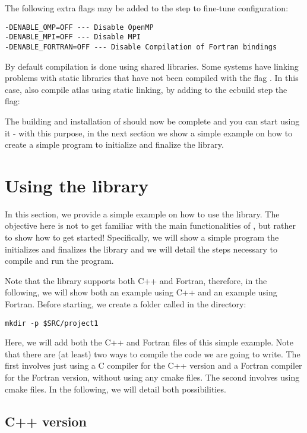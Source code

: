 The following extra flags may be added to the  
step to fine-tune configuration:
%
\begin{lstlisting}[style=BashStyle]
-DENABLE_OMP=OFF --- Disable OpenMP
-DENABLE_MPI=OFF --- Disable MPI
-DENABLE_FORTRAN=OFF --- Disable Compilation of Fortran bindings
\end{lstlisting}
%
%
\begin{notebox}
By default compilation is done using shared libraries. Some systems have 
linking problems with static libraries that have not been compiled with 
the flag . In this case, also compile atlas using static 
linking, by adding to the ecbuild step the flag: 
\end{notebox}
%
The building and installation of \Atlas should now be complete 
and you can start using it - with this purpose, in the next 
section we show a simple example on how to create a simple 
program to initialize and finalize the library.




\section{Using the library}
\label{s:using}
In this section, we provide a simple example on how to use the 
library. The objective here is not to get familiar with the main 
functionalities of \Atlas, but rather to show how to get started!
Specifically, we will show a simple program the initializes and 
finalizes the library and we will detail the steps necessary to
compile and run the program.

Note that the library supports both C++ and Fortran, therefore, 
in the following, we will show both an example using C++ and 
an example using Fortran. Before starting, we create a folder 
called  in the  directory:
%
\begin{lstlisting}[style=BashStyle]
mkdir -p $SRC/project1
\end{lstlisting}
%
Here, we will add both the C++ and Fortran files of this 
simple example. Note that there are (at least) two ways 
to compile the code we are going to write. The first involves 
just using a C compiler for the C++ version and a Fortran 
compiler for the Fortran version, without using any cmake 
files. The second involves using cmake files. In the following, 
we will detail both possibilities.

\subsection{C++ version}
\label{s:atlas-usage-example-C}


